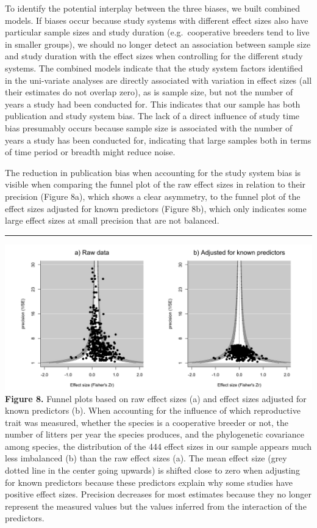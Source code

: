 \documentclass[
]{article}
\begin{document}
To identify the potential interplay between the three biases, we built
combined models. If biases occur because study systems with different
effect sizes also have particular sample sizes and study duration
(e.g.~cooperative breeders tend to live in smaller groups), we should no
longer detect an association between sample size and study duration with
the effect sizes when controlling for the different study systems. The
combined models indicate that the study system factors identified in the
uni-variate analyses are directly associated with variation in effect
sizes (all their estimates do not overlap zero), as is sample size, but
not the number of years a study had been conducted for. This indicates
that our sample has both publication and study system bias. The lack of
a direct influence of study time bias presumably occurs because sample
size is associated with the number of years a study has been conducted
for, indicating that large samples both in terms of time period or
breadth might reduce noise.

The reduction in publication bias when accounting for the study system
bias is visible when comparing the funnel plot of the raw effect sizes
in relation to their precision (Figure 8a), which shows a clear
asymmetry, to the funnel plot of the effect sizes adjusted for known
predictors (Figure 8b), which only indicates some large effect sizes at
small precision that are not balanced.

\begin{center}\rule{0.5\linewidth}{0.5pt}\end{center}

\includegraphics{ranksuccess_Fig7_effectsize_funnelplot.png}
\textbf{Figure 8.} Funnel plots based on raw effect sizes (a) and effect
sizes adjusted for known predictors (b). When accounting for the
influence of which reproductive trait was measured, whether the species
is a cooperative breeder or not, the number of litters per year the
species produces, and the phylogenetic covariance among species, the
distribution of the 444 effect sizes in our sample appears much less
imbalanced (b) than the raw effect sizes (a). The mean effect size (grey
dotted line in the center going upwards) is shifted close to zero when
adjusting for known predictors because these predictors explain why some
studies have positive effect sizes. Precision decreases for most
estimates because they no longer represent the measured values but the
values inferred from the interaction of the predictors.
\end{document}
